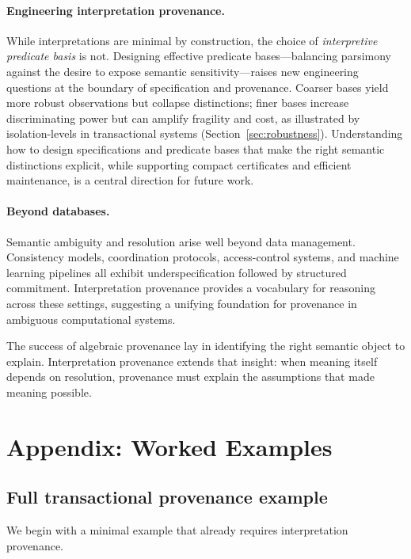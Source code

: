 \documentclass[acmsmall,nonacm]{acmart}
\theoremstyle{remark}
\numberwithin{definition}{section}
\numberwithin{theorem}{section}
\numberwithin{lemma}{section}
\numberwithin{corollary}{section}
\numberwithin{remark}{section}
\numberwithin{example}{section}
\numberwithin{observation}{section}
\numberwithin{assumption}{section}
\begin{document}
\paragraph{Engineering interpretation provenance.}
While interpretations are minimal by construction, the choice of
\emph{interpretive predicate basis} is not.
Designing effective predicate bases—balancing parsimony against the desire to
expose semantic sensitivity—raises new engineering questions at the boundary of
specification and provenance.
Coarser bases yield more robust observations but collapse distinctions; finer
bases increase discriminating power but can amplify fragility and cost, as
illustrated by isolation-levels in transactional systems (Section~\ref{sec:robustness}).
Understanding how to design specifications and predicate bases that make the
right semantic distinctions explicit, while supporting compact certificates and
efficient maintenance, is a central direction for future work.

\paragraph{Beyond databases.}
Semantic ambiguity and resolution arise well beyond data management.
Consistency models, coordination protocols, access-control systems, and machine
learning pipelines all exhibit underspecification followed by structured
commitment.
Interpretation provenance provides a vocabulary for reasoning across these
settings, suggesting a unifying foundation for provenance in ambiguous
computational systems.

The success of algebraic provenance lay in identifying the right semantic object
to explain.
Interpretation provenance extends that insight: when meaning itself depends on
resolution, provenance must explain the assumptions that made meaning possible.

\appendix
\section{Appendix: Worked Examples}
\label{sec:appendix-examples}

\subsection{Full transactional provenance example}
\label{sec:appendix-concurrency}

We begin with a minimal example that already requires interpretation provenance.
\end{document}
